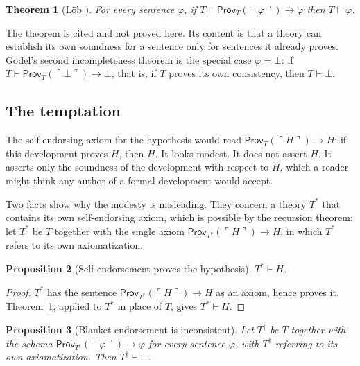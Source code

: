 \documentclass[11pt]{article}
\theoremstyle{plain}
\newtheorem{theorem}{Theorem}[section]
\newtheorem{proposition}[theorem]{Proposition}
\theoremstyle{definition}
\theoremstyle{remark}
\newcommand{\Hyp}{H}
\newcommand{\prov}{\mathsf{Prov}}
\begin{document}
\begin{theorem}[L\"ob \cite{lob1955}]\label{thm:lob}
For every sentence $\varphi$, if $T\vdash\prov_T(\ulcorner\varphi\urcorner)\to\varphi$ then $T\vdash\varphi$.
\end{theorem}

The theorem is cited and not proved here. Its content is that a theory can establish its own soundness for a sentence only for sentences it already proves. Gödel's second incompleteness theorem is the special case $\varphi=\bot$: if $T\vdash\prov_T(\ulcorner\bot\urcorner)\to\bot$, that is, if $T$ proves its own consistency, then $T\vdash\bot$.

\subsection{The temptation}

The self-endorsing axiom for the hypothesis would read $\prov_{T}(\ulcorner\Hyp\urcorner)\to\Hyp$: if this development proves $\Hyp$, then $\Hyp$. It looks modest. It does not assert $\Hyp$. It asserts only the soundness of the development with respect to $\Hyp$, which a reader might think any author of a formal development would accept.

Two facts show why the modesty is misleading. They concern a theory $T^{*}$ that contains its own self-endorsing axiom, which is possible by the recursion theorem: let $T^{*}$ be $T$ together with the single axiom $\prov_{T^{*}}(\ulcorner\Hyp\urcorner)\to\Hyp$, in which $T^{*}$ refers to its own axiomatization.

\begin{proposition}[Self-endorsement proves the hypothesis]\label{prop:selfend}
$T^{*}\vdash\Hyp$.
\end{proposition}

\begin{proof}
$T^{*}$ has the sentence $\prov_{T^{*}}(\ulcorner\Hyp\urcorner)\to\Hyp$ as an axiom, hence proves it. Theorem~\ref{thm:lob}, applied to $T^{*}$ in place of $T$, gives $T^{*}\vdash\Hyp$. \qedhere
\end{proof}

\begin{proposition}[Blanket endorsement is inconsistent]\label{prop:blanket}
Let $T^{\dagger}$ be $T$ together with the schema $\prov_{T^{\dagger}}(\ulcorner\varphi\urcorner)\to\varphi$ for every sentence $\varphi$, with $T^{\dagger}$ referring to its own axiomatization. Then $T^{\dagger}\vdash\bot$.
\end{proposition}
\end{document}
